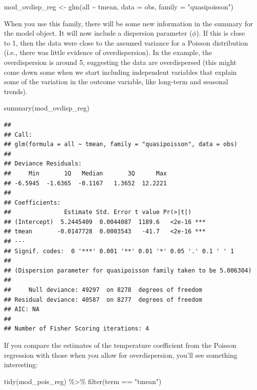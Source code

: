 \documentclass[
]{book}
\newenvironment{Shaded}{\begin{snugshade}}{\end{snugshade}}
\newcommand{\AttributeTok}[1]{\textcolor[rgb]{0.77,0.63,0.00}{#1}}
\newcommand{\FunctionTok}[1]{\textcolor[rgb]{0.00,0.00,0.00}{#1}}
\newcommand{\NormalTok}[1]{#1}
\newcommand{\OtherTok}[1]{\textcolor[rgb]{0.56,0.35,0.01}{#1}}
\newcommand{\SpecialCharTok}[1]{\textcolor[rgb]{0.00,0.00,0.00}{#1}}
\newcommand{\StringTok}[1]{\textcolor[rgb]{0.31,0.60,0.02}{#1}}
\begin{document}
\begin{Shaded}
\begin{Highlighting}[]
\NormalTok{mod\_ovdisp\_reg }\OtherTok{\textless{}{-}} \FunctionTok{glm}\NormalTok{(all }\SpecialCharTok{\textasciitilde{}}\NormalTok{ tmean, }\AttributeTok{data =}\NormalTok{ obs, }\AttributeTok{family =} \StringTok{"quasipoisson"}\NormalTok{)}
\end{Highlighting}
\end{Shaded}

When you use this family, there will be some new information in the summary
for the model object. It will now include a dispersion parameter (\(\phi\)). If this
is close to 1, then the data were close to the assumed variance for a Poisson
distribution (i.e., there was little evidence of overdispersion). In the
example, the overdispersion is around 5, suggesting the data are overdispersed
(this might come down some when we start including independent variables that
explain some of the variation in the outcome variable, like long-term and
seasonal trends).

\begin{Shaded}
\begin{Highlighting}[]
\FunctionTok{summary}\NormalTok{(mod\_ovdisp\_reg)}
\end{Highlighting}
\end{Shaded}

\begin{verbatim}
## 
## Call:
## glm(formula = all ~ tmean, family = "quasipoisson", data = obs)
## 
## Deviance Residuals: 
##     Min       1Q   Median       3Q      Max  
## -6.5945  -1.6365  -0.1167   1.3652  12.2221  
## 
## Coefficients:
##               Estimate Std. Error t value Pr(>|t|)    
## (Intercept)  5.2445409  0.0044087  1189.6   <2e-16 ***
## tmean       -0.0147728  0.0003543   -41.7   <2e-16 ***
## ---
## Signif. codes:  0 '***' 0.001 '**' 0.01 '*' 0.05 '.' 0.1 ' ' 1
## 
## (Dispersion parameter for quasipoisson family taken to be 5.006304)
## 
##     Null deviance: 49297  on 8278  degrees of freedom
## Residual deviance: 40587  on 8277  degrees of freedom
## AIC: NA
## 
## Number of Fisher Scoring iterations: 4
\end{verbatim}

If you compare the estimates of the temperature coefficient from the Poisson
regression with those when you allow for overdispersion, you'll see something
interesting:

\begin{Shaded}
\begin{Highlighting}[]
\FunctionTok{tidy}\NormalTok{(mod\_pois\_reg) }\SpecialCharTok{\%\textgreater{}\%} 
  \FunctionTok{filter}\NormalTok{(term }\SpecialCharTok{==} \StringTok{"tmean"}\NormalTok{)}
\end{Highlighting}
\end{Shaded}
\end{document}
